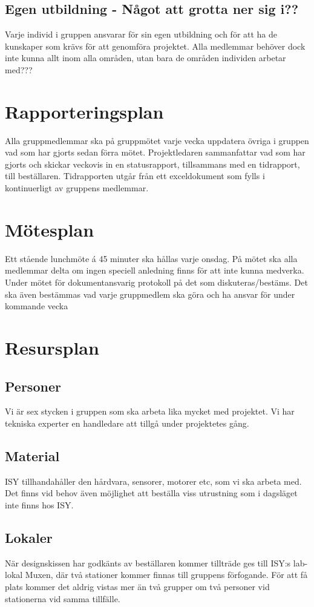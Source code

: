 \documentclass[11pt]{article}
\begin{document}
\begin{flushleft}
\subsection{Egen utbildning - Något att grotta ner sig i??}
Varje individ i gruppen ansvarar för sin egen utbildning och för att ha de kunskaper som krävs för att genomföra projektet. Alla medlemmar behöver dock inte kunna allt inom alla områden, utan bara de områden individen arbetar med???


\pagebreak
\section{Rapporteringsplan}
Alla gruppmedlemmar ska på gruppmötet varje vecka uppdatera övriga i gruppen vad som har gjorts sedan förra mötet. Projektledaren sammanfattar vad som har gjorts och skickar veckovis in en statusrapport, tillsammans med en tidrapport, till beställaren. Tidrapporten utgår från ett exceldokument som fylls i kontinuerligt av gruppens medlemmar.

\pagebreak
\section{Mötesplan}
Ett stående lunchmöte á 45 minuter ska hållas varje onsdag. På mötet ska alla medlemmar delta om ingen speciell anledning finns för att inte kunna medverka. Under mötet för dokumentansvarig protokoll på det som diskuteras/bestäms. Det ska även bestämmas vad varje gruppmedlem ska göra och ha ansvar för under kommande vecka

\pagebreak
\section{Resursplan}
\subsection{Personer}
Vi är sex stycken i gruppen som ska arbeta lika mycket med projektet. Vi har tekniska experter en handledare att tillgå under projektetes gång.

\subsection{Material}
ISY tillhandahåller den hårdvara, sensorer, motorer etc, som vi ska arbeta med. Det finns vid behov även möjlighet att beställa viss utrustning som i dagsläget inte finns hos ISY. 

\subsection{Lokaler}
När designskissen har godkänts av beställaren kommer tillträde ges till ISY:s lab-lokal Muxen, där två stationer kommer finnas till gruppens förfogande. För att få plats kommer det aldrig vistas mer än två grupper om två personer vid stationerna vid samma tillfälle.


\end{flushleft}
\end{document}

